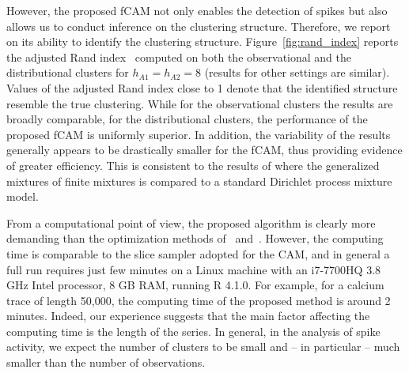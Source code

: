However, the proposed fCAM not only enables the detection of spikes but also allows us to conduct inference on the clustering structure. Therefore, we report on its ability to identify the clustering structure. Figure~\ref{fig:rand_index} reports the adjusted Rand index~\parencite{rand1971,hubert1985} computed on both the observational and the distributional clusters for $h_{A1} = h_{A2} = 8$ (results for other settings are similar). Values of the adjusted Rand index close to 1 denote that the identified structure resemble the true clustering. While for the observational clusters the results are broadly comparable, for the distributional clusters, the performance of the proposed fCAM is uniformly superior. In addition, the variability of the results generally appears to be drastically smaller for the fCAM, thus providing evidence of greater efficiency. This is consistent to the results of \textcite{fruhwirthschnatter2020} where  the generalized mixtures of finite mixtures is compared to a standard Dirichlet process mixture model. 

From a computational point of view, the proposed algorithm is clearly more demanding than the optimization methods of~\textcite{jewell2019} and~\textcite{friedrich2017}.  However, the computing time is comparable to the slice sampler adopted for the CAM, and in general a full run requires just few minutes on a Linux machine with an i7-7700HQ 3.8 GHz Intel processor, 8 GB RAM, running R 4.1.0. For example, for a calcium trace of length 50,000, the computing time of the proposed method is around 2 minutes. Indeed, our experience suggests that the main factor affecting the computing time is the length of the series.  In general, in the analysis of spike activity, we expect the number of clusters  to be small and -- in particular -- much smaller than the number of observations.


